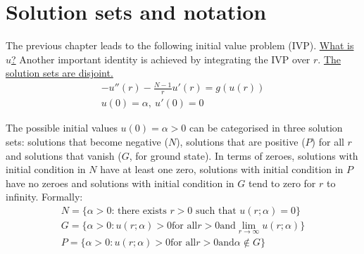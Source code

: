 \section{Solution sets and notation}\label{not}
The previous chapter leads to the following initial value problem (IVP). \underline{What is $u$?} Another important identity is achieved by integrating the IVP over $r$. \underline{The solution sets are disjoint.}
\begin{gather*}-u''(r)-\frac{N-1}{r}u'(r)=g(u(r))\tag{IVP}\label{ivp}\\ u(0)=\alpha,~u'(0)=0\end{gather*}
\begin{equation}\label{ivpint}
\end{equation}

The possible initial values $u(0)=\alpha>0$ can be categorised in three solution sets: solutions that become negative ($N$), solutions that are positive ($P$) for all $r$ and solutions that vanish ($G$, for ground state). In terms of zeroes, solutions with initial condition in $N$ have at least one zero, solutions with initial condition in $P$ have no zeroes and solutions with initial condition in $G$ tend to zero for $r$ to infinity. Formally:
\begin{gather*}
  N = \text{\{$\alpha>0$: there exists $r>0$ such that $u(r;\alpha)=0$\}} \\
  G = \{\alpha>0: u(r;\alpha)>0 \text{for all} r>0 \text{and} \underset{r\to\infty}{\lim}u(r;\alpha)\}\\
  P = \{\alpha>0: u(r;\alpha)>0 \text{for all} r>0 \text{and} \alpha\notin G\}
\end{gather*}
